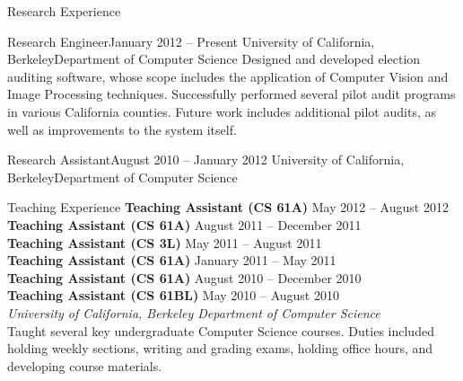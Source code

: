 \documentclass{resume}
\begin{document}
\begin{component}{Research Experience}
    \begin{position}{Research Engineer}{January 2012 -- Present}
        {University of California, Berkeley}{Department of Computer Science}
    {Designed and developed election auditing software, whose scope includes the application of Computer Vision and Image Processing techniques. Successfully performed several pilot audit programs in various California counties. Future work includes additional pilot audits, as well as improvements to the system itself.}
    \end{position}
    
    \begin{position}{Research Assistant}{August 2010 -- January 2012}
        {University of California, Berkeley}{Department of Computer Science}
    {}
    \end{position}
\end{component}

\vspace{-2.0em}

\begin{component}{Teaching Experience}
    \textbf{Teaching Assistant (CS 61A)} \hfill May 2012 -- August 2012 \\
    \textbf{Teaching Assistant (CS 61A)} \hfill August 2011 -- December 2011 \\
    \textbf{Teaching Assistant (CS 3L)} \hfill May 2011 -- August 2011 \\
    \textbf{Teaching Assistant (CS 61A)} \hfill January 2011 -- May 2011 \\
    \textbf{Teaching Assistant (CS 61A)} \hfill August 2010 -- December 2010 \\
    \textbf{Teaching Assistant (CS 61BL)} \hfill May 2010 -- August 2010 \\
        \textit{University of California, Berkeley \hfill Department of Computer Science}\\
    Taught several key undergraduate Computer Science courses. Duties included holding weekly sections, writing and grading exams, holding office hours, and developing course materials.
\end{component}
\end{document}
